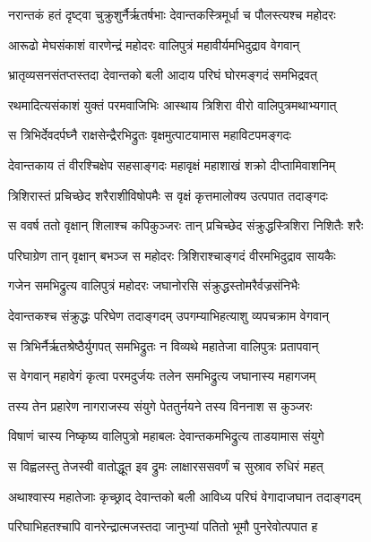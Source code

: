 
\twolineshloka
{नरान्तकं हतं दृष्ट्वा चुक्रुशुर्नैर्ऋतर्षभाः}
{देवान्तकस्त्रिमूर्धा च पौलस्त्यश्च महोदरः} %

\twolineshloka
{आरूढो मेघसंकाशं वारणेन्द्रं महोदरः}
{वालिपुत्रं महावीर्यमभिदुद्राव वेगवान्} %

\twolineshloka
{भ्रातृव्यसनसंतप्तस्तदा देवान्तको बली}
{आदाय परिघं घोरमङ्गदं समभिद्रवत्} %

\twolineshloka
{रथमादित्यसंकाशं युक्तं परमवाजिभिः}
{आस्थाय त्रिशिरा वीरो वालिपुत्रमथाभ्यगात्} %

\twolineshloka
{स त्रिभिर्देवदर्पघ्नै राक्षसेन्द्रैरभिद्रुतः}
{वृक्षमुत्पाटयामास महाविटपमङ्गदः} %

\twolineshloka
{देवान्तकाय तं वीरश्चिक्षेप सहसाङ्गदः}
{महावृक्षं महाशाखं शक्रो दीप्तामिवाशनिम्} %

\twolineshloka
{त्रिशिरास्तं प्रचिच्छेद शरैराशीविषोपमैः}
{स वृक्षं कृत्तमालोक्य उत्पपात तदाङ्गदः} %

\twolineshloka
{स ववर्ष ततो वृक्षान् शिलाश्च कपिकुञ्जरः}
{तान् प्रचिच्छेद संक्रुद्धस्त्रिशिरा निशितैः शरैः} %

\twolineshloka
{परिघाग्रेण तान् वृक्षान् बभञ्ज स महोदरः}
{त्रिशिराश्चाङ्गदं वीरमभिदुद्राव सायकैः} %

\twolineshloka
{गजेन समभिद्रुत्य वालिपुत्रं महोदरः}
{जघानोरसि संक्रुद्धस्तोमरैर्वज्रसंनिभैः} %

\twolineshloka
{देवान्तकश्च संक्रुद्धः परिघेण तदाङ्गदम्}
{उपगम्याभिहत्याशु व्यपचक्राम वेगवान्} %

\twolineshloka
{स त्रिभिर्नैर्ऋतश्रेष्ठैर्युगपत् समभिद्रुतः}
{न विव्यथे महातेजा वालिपुत्रः प्रतापवान्} %

\twolineshloka
{स वेगवान् महावेगं कृत्वा परमदुर्जयः}
{तलेन समभिद्रुत्य जघानास्य महागजम्} %

\twolineshloka
{तस्य तेन प्रहारेण नागराजस्य संयुगे}
{पेततुर्नयने तस्य विननाश स कुञ्जरः} %

\twolineshloka
{विषाणं चास्य निष्कृष्य वालिपुत्रो महाबलः}
{देवान्तकमभिद्रुत्य ताडयामास संयुगे} %

\twolineshloka
{स विह्वलस्तु तेजस्वी वातोद्धूत इव द्रुमः}
{लाक्षारससवर्णं च सुस्राव रुधिरं महत्} %

\twolineshloka
{अथाश्वास्य महातेजाः कृच्छ्राद् देवान्तको बली}
{आविध्य परिघं वेगादाजघान तदाङ्गदम्} %

\twolineshloka
{परिघाभिहतश्चापि वानरेन्द्रात्मजस्तदा}
{जानुभ्यां पतितो भूमौ पुनरेवोत्पपात ह} %

